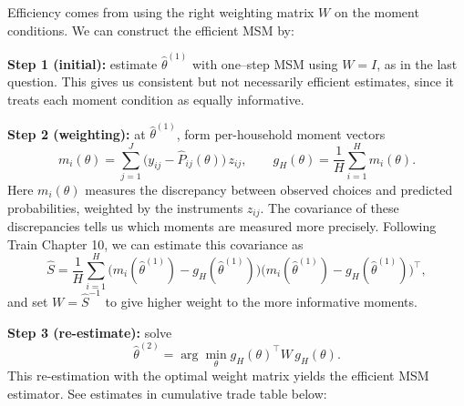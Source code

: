 \documentclass{article}
\begin{document}
Efficiency comes from using the right weighting matrix $W$ on the moment conditions. We can construct the efficient MSM by:

\textbf{Step 1 (initial):} estimate $\hat\theta^{(1)}$ with one–step MSM using $W=I$, as in the last question. 
This gives us consistent but not necessarily efficient estimates, since it treats each moment condition as equally informative.

\vspace{5mm}

\textbf{Step 2 (weighting):} at $\hat\theta^{(1)}$, form per-household moment vectors
\[
m_i(\theta)=\sum_{j=1}^J \big(y_{ij}-\hat P_{ij}(\theta)\big)\,z_{ij},
\qquad
g_H(\theta)=\frac{1}{H}\sum_{i=1}^H m_i(\theta).
\]
Here $m_i(\theta)$ measures the discrepancy between observed choices and predicted probabilities, weighted by the instruments $z_{ij}$. 
The covariance of these discrepancies tells us which moments are measured more precisely. 
Following Train Chapter 10, we can estimate this covariance as
\[
\widehat S=\frac{1}{H}\sum_{i=1}^H\Big(m_i(\hat\theta^{(1)})-g_H(\hat\theta^{(1)})\Big)
\Big(m_i(\hat\theta^{(1)})-g_H(\hat\theta^{(1)})\Big)^\top,
\]
and set $W=\widehat S^{-1}$ to give higher weight to the more informative moments.

\vspace{5mm}

\textbf{Step 3 (re-estimate):} solve
\[
\hat\theta^{(2)}=\arg\min_\theta g_H(\theta)^\top W\, g_H(\theta).
\]
This re-estimation with the optimal weight matrix yields the efficient MSM estimator. See estimates in cumulative trade table below:

\begin{table}[H]
\centering
{}
\caption{Estimation results for logit models.}
\end{table}
\end{document}
